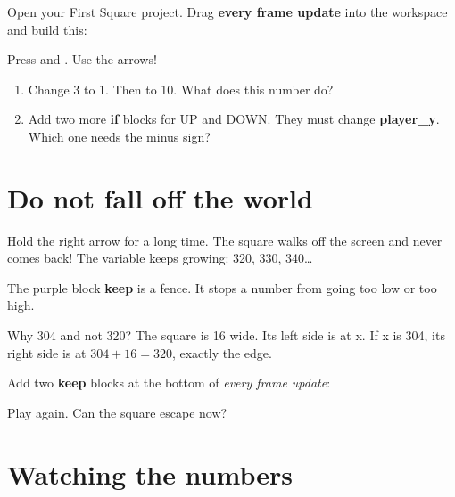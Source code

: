 \begin{prgmission}
Open your First Square project. Drag \textbf{every frame update} into the
workspace and build this:


Press  and . Use the arrows!
\end{prgmission}

\begin{prgtry}
\begin{enumerate}
  \item Change 3 to 1. Then to 10. What does this number do?
  \item Add two more \textbf{if} blocks for UP and DOWN. They must change
        \textbf{player\_y}. Which one needs the minus sign?
\end{enumerate}
\end{prgtry}

\section{Do not fall off the world}

Hold the right arrow for a long time. The square walks off the screen and never
comes back! The variable keeps growing: 320, 330, 340\dots

The purple block \textbf{keep} is a fence. It stops a number from going too low
or too high.


Why 304 and not 320? The square is 16 wide. Its left side is at x. If x is 304,
its right side is at $304 + 16 = 320$, exactly the edge.

\begin{prgmission}
Add two \textbf{keep} blocks at the bottom of \emph{every frame update}:


Play again. Can the square escape now?
\end{prgmission}

\section{Watching the numbers}


